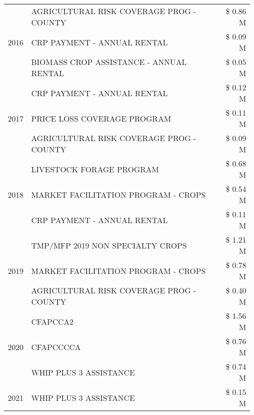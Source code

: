 \begin{tabular}{llr}
\cline{1-3}
\multirow[t]{3}{*}{2016} & AGRICULTURAL RISK COVERAGE PROG - COUNTY & \$ 0.86 M \\
 & CRP PAYMENT - ANNUAL RENTAL & \$ 0.09 M \\
 & BIOMASS CROP ASSISTANCE - ANNUAL RENTAL & \$ 0.05 M \\
\cline{1-3}
\multirow[t]{3}{*}{2017} & CRP PAYMENT - ANNUAL RENTAL & \$ 0.12 M \\
 & PRICE LOSS COVERAGE PROGRAM & \$ 0.11 M \\
 & AGRICULTURAL RISK COVERAGE PROG - COUNTY & \$ 0.09 M \\
\cline{1-3}
\multirow[t]{3}{*}{2018} & LIVESTOCK FORAGE PROGRAM & \$ 0.68 M \\
 & MARKET FACILITATION PROGRAM - CROPS & \$ 0.54 M \\
 & CRP PAYMENT - ANNUAL RENTAL & \$ 0.11 M \\
\cline{1-3}
\multirow[t]{3}{*}{2019} & TMP/MFP 2019 NON SPECIALTY CROPS & \$ 1.21 M \\
 & MARKET FACILITATION PROGRAM - CROPS & \$ 0.78 M \\
 & AGRICULTURAL RISK COVERAGE PROG - COUNTY & \$ 0.40 M \\
\cline{1-3}
\multirow[t]{3}{*}{2020} & CFAPCCA2 & \$ 1.56 M \\
 & CFAPCCCCA & \$ 0.76 M \\
 & WHIP PLUS 3 ASSISTANCE & \$ 0.74 M \\
\cline{1-3}
2021 & WHIP PLUS 3 ASSISTANCE & \$ 0.15 M \\
\cline{1-3}
\bottomrule
\end{tabular}
